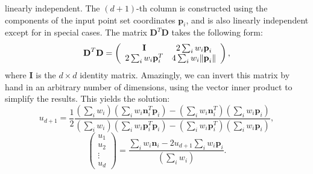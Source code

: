 \documentclass[final,3p,times,twocolumn]{elsarticle}
\begin{document}
linearly independent. The $(d+1)$-th column is constructed using the components
of the input point set coordinates $\textbf{p}_i$, and is also linearly independent
except for in special cases.
The matrix  $\textbf{D}^T\textbf{D}$ takes the following form:
\begin{equation}
 \textbf{D}^T\textbf{D} = \left( \begin{array}{c c}
              \textbf{I} & 2 \sum_i w_i \textbf{p}_i \\
              2 \sum_i w_i \textbf{p}_i^T & 4 \sum_i w_i \lVert \textbf{p}_i \rVert
              \end{array} \right),
\end{equation}
where $\textbf{I}$ is the $d \times d$ identity matrix. Amazingly, we can
invert this matrix by hand in an arbitrary number of dimensions, using the vector
inner product to simplify the results. This yields the solution:
\begin{equation}
 u_{d+1} = \frac{1}{2} \frac{\left( \sum_i w_i \right)\left( \sum_i w_i \textbf{n}_i^T \textbf{p}_i  \right) - \left( \sum_i w_i \textbf{n}_i^T \right) \left( \sum_i w_i \textbf{p}_i \right)  }
 {\left( \sum_i w_i \right)\left( \sum_i w_i \textbf{p}_i^T \textbf{p}_i  \right) - \left( \sum_i w_i \textbf{p}_i^T \right) \left( \sum_i w_i \textbf{p}_i \right)} ,
\end{equation}
\begin{equation}
 \left( \begin{array}{c}
         u_1 \\
         u_2 \\
         \vdots \\
         u_d
        \end{array}
 \right) = \frac{\sum_i w_i \textbf{n}_i - 2 u_{d+1} \sum_i w_i \textbf{p}_i}{\left( \sum_i w_i \right)} .
\end{equation}
\end{document}
